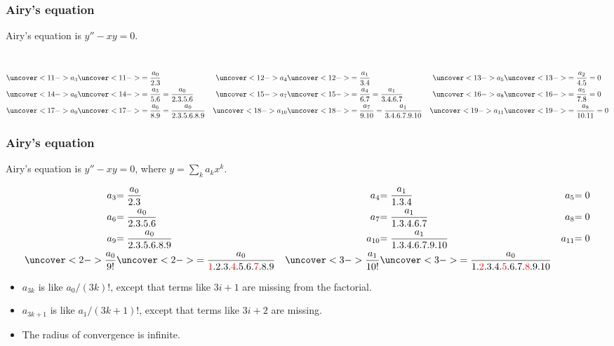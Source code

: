 \documentclass[9pt]{beamer}
\begin{document}
\begin{frame}[t]
 \frametitle{Airy's equation}

 Airy's equation is $y''-xy=0$.

 \\
 \begin{align*}
  \uc<11->{a_3   } &\uc<11->{= \frac{a_0}{2.3}} &
  \uc<12->{a_4   } &\uc<12->{= \frac{a_1}{3.4}} &
  \uc<13->{a_5   } &\uc<13->{= \frac{a_2}{4.5} = 0 }\\
  \uc<14->{a_6   } &\uc<14->{= \frac{a_3}{5.6} = \frac{a_0}{2.3.5.6}} &
  \uc<15->{a_7   } &\uc<15->{= \frac{a_4}{6.7} = \frac{a_1}{3.4.6.7}} &
  \uc<16->{a_8   } &\uc<16->{= \frac{a_5}{7.8} = 0 }\\
  \uc<17->{a_9   } &\uc<17->{= \frac{a_6}{8.9} = \frac{a_0}{2.3.5.6.8.9}} &
  \uc<18->{a_{10}} &\uc<18->{= \frac{a_7}{9.10} = \frac{a_1}{3.4.6.7.9.10}} &
  \uc<19->{a_{11}} &\uc<19->{= \frac{a_8}{10.11} = 0 }
 \end{align*}
\end{frame}

\begin{frame}[t]
 \frametitle{Airy's equation}

 Airy's equation is $y''-xy=0$, where $y=\sum_ka_kx^k$.

 \begin{align*}
  {a_3   } &{= \frac{a_0}{2.3}} &
  {a_4   } &{= \frac{a_1}{1.3.4}} &
  {a_5   } &{= 0 }\\
  {a_6   } &{= \frac{a_0}{2.3.5.6}} &
  {a_7   } &{= \frac{a_1}{1.3.4.6.7}} &
  {a_8   } &{= 0 }\\
  {a_9   } &{= \frac{a_0}{2.3.5.6.8.9}} &
  {a_{10}} &{= \frac{a_1}{1.3.4.6.7.9.10}} &
  {a_{11}} &{= 0 } \\
  \uc<2->{\frac{a_0}{9!}} &\uc<2->{= \frac{a_0}{\RED{1}.2.3.\RED{4}.5.6.\RED{7}.8.9}} &
  \uc<3->{\frac{a_1}{10!}} &\uc<3->{= \frac{a_0}{1.\RED{2}.3.4.\RED{5}.6.7.\RED{8}.9.10}} 
 \end{align*}

 \begin{itemize}
  \item<2-> $a_{3k}$ is like $a_0/(3k)!$, except that terms like $3i+1$ are missing from the factorial.
  \item<3-> $a_{3k+1}$ is like $a_1/(3k+1)!$, except that terms like $3i+2$ are missing.
  \item<4-> The radius of convergence is infinite.
 \end{itemize}
\end{frame}
\end{document}
